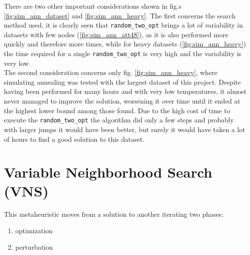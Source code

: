 There are two other important considerations shown in fig.s \ref{fig:sim_ann_dataset} and \ref{fig:sim_ann_heavy}. The first concerns the search method used, it is clearly seen that \texttt{random\_two\_opt} brings a lot of variability in datasets with few nodes (\ref{fig:sim_ann_att48}), as it is also performed more quickly and therefore more times, while for heavy datasets (\ref{fig:sim_ann_heavy}) the time required for a single \texttt{random\_two\_opt} is very high and the variability is very low. \\
The second consideration concerns only fig. \ref{fig:sim_ann_heavy}, where simulating annealing was tested with the largest dataset of this project. Despite having been performed for many hours and with very low temperatures, it almost never managed to improve the solution, worsening it over time until it ended at the highest lower bound among those found. Due to the high cost of time to execute the \texttt{random\_two\_opt} the algorithm did only a few steps and probably with larger jumps it would have been better, but surely it would have taken a lot of hours to find a good solution to this dataset.


\section{Variable Neighborhood Search (VNS)}

This metaheuristic moves from a solution to another iterating two phases:
\begin{enumerate}
	\item optimization
	\item perturbation
\end{enumerate}

